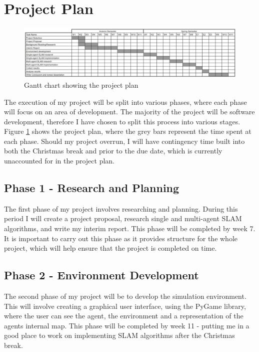 \documentclass[12pt]{article}
\begin{document}
\section{Project Plan}
\begin{figure}[H]
    \centering
    \includegraphics[width=0.8\linewidth]{gantt_chart.png}
    \caption{Gantt chart showing the project plan}
    \label{fig:gantt_chart}
\end{figure}
The execution of my project will be split into various phases, where each phase will focus on an area of development. The
majority of the project will be software development, therefore I have chosen to split this process into various stages. Figure
\ref{fig:gantt_chart} shows the project plan, where the grey bars represent the time spent at each phase. Should my project
overrun, I will have contingency time built into both the Christmas break and prior to the due date, which is currently unaccounted
for in the project plan.\\

\subsection{Phase 1 - Research and Planning}
The first phase of my project involves researching and planning. During this period I will create a project proposal,
research single and multi-agent SLAM algorithms, and write my interim report. This phase will be completed by week 7. It is
important to carry out this phase as it provides structure for the whole project, which will help ensure that the project is
completed on time.

\subsection{Phase 2 - Environment Development}
The second phase of my project will be to develop the simulation environment. This will involve creating a graphical user
interface, using the PyGame library, where the user can see the agent, the environment and a representation of the agents
internal map. This phase will be completed by week 11 - putting me in a good place to work on implementing SLAM algorithms
after the Christmas break.
\end{document}
